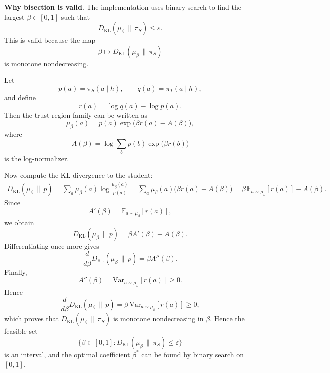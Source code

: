 \documentclass[11pt]{article}
\renewcommand{\paragraph}[1]{\vspace{1mm}\noindent\textbf{#1}.}
\begin{document}
\paragraph{Why bisection is valid}
The implementation uses binary search to find the largest $\beta \in [0,1]$ such that
\[
D_{\mathrm{KL}}(\mu_\beta \,\|\, \pi_S) \le \varepsilon.
\]
This is valid because the map
\[
\beta \mapsto D_{\mathrm{KL}}(\mu_\beta \,\|\, \pi_S)
\]
is monotone nondecreasing.

Let
\[
p(a)=\pi_S(a \mid h),
\qquad
q(a)=\pi_T(a \mid h),
\]
and define
\[
r(a)=\log q(a)-\log p(a).
\]
Then the trust-region family can be written as
\begin{equation}
\mu_\beta(a)
=
p(a)\exp\!\bigl(\beta r(a)-A(\beta)\bigr),
\end{equation}
where
\begin{equation}
A(\beta)
=
\log \sum_b p(b)\exp\!\bigl(\beta r(b)\bigr)
\end{equation}
is the log-normalizer.

Now compute the KL divergence to the student:
\begin{equation*}
\begin{split}
D_{\mathrm{KL}}(\mu_\beta \,\|\, p)=
\sum_a \mu_\beta(a)\log\frac{\mu_\beta(a)}{p(a)}=
\sum_a \mu_\beta(a)\bigl(\beta r(a)-A(\beta)\bigr)=
\beta\,\mathbb{E}_{a \sim \mu_\beta}[r(a)]-A(\beta).
\end{split}
\end{equation*}
Since
\[
A'(\beta)=\mathbb{E}_{a \sim \mu_\beta}[r(a)],
\]
we obtain
\begin{equation}
D_{\mathrm{KL}}(\mu_\beta \,\|\, p)
=
\beta A'(\beta)-A(\beta).
\end{equation}
Differentiating once more gives
\begin{equation}
\frac{d}{d\beta}
D_{\mathrm{KL}}(\mu_\beta \,\|\, p)
=
\beta A''(\beta).
\end{equation}
Finally,
\begin{equation}
A''(\beta)
=
\mathrm{Var}_{a \sim \mu_\beta}[r(a)]
\ge 0.
\end{equation}
Hence
\[
\frac{d}{d\beta}
D_{\mathrm{KL}}(\mu_\beta \,\|\, p)
=
\beta\,\mathrm{Var}_{a \sim \mu_\beta}[r(a)]
\ge 0,
\]
which proves that $D_{\mathrm{KL}}(\mu_\beta \,\|\, \pi_S)$ is monotone nondecreasing in $\beta$.
Hence the feasible set
\[
\{\beta \in [0,1] : D_{\mathrm{KL}}(\mu_\beta \,\|\, \pi_S) \le \varepsilon\}
\]
is an interval, and the optimal coefficient $\beta^*$ can be found by binary search on $[0,1]$.
\end{document}
